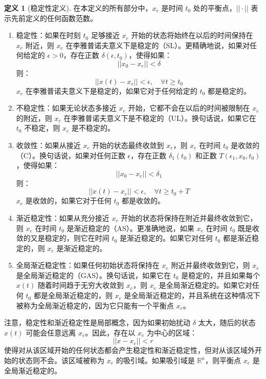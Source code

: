\documentclass[UTF8,12pt,a4paper]{ctexart}
\theoremstyle{definition}
\newtheorem{definition}{定义}[section]
\begin{document}
\begin{definition}[稳定性定义]\label{def:stability}
在本定义的所有部分中，$x_e$ 是时间 $t_0$ 处的平衡点，$||\cdot||$ 表示先前定义的任何函数范数。
\begin{enumerate}
\item 稳定性：如果在时刻 $t_0$ 足够接近 $x_e$ 开始的状态将始终在以后的时间保持在 $x_e$ 附近，则 $x_e$ 在李雅普诺夫意义下是稳定的（SL）。更精确地说，如果对任何给定的 $\epsilon > 0$，存在正数 $\delta(\epsilon, t_0)$，使得如果：
\[
||x_0 - x_e|| < \delta
\]
则：
\[
||x(t) - x_e|| < \epsilon, \quad \forall t \geq t_0
\]
$x_e$ 在李雅普诺夫意义下是稳定的，如果它对于任何给定的 $t_0$ 都是稳定的。

\item 不稳定性：如果无论状态多接近 $x_e$ 开始，它都不会在以后的时间被限制在 $x_e$ 的附近，则 $x_e$ 在李雅普诺夫意义下是不稳定的（UL）。换句话说，如果它在 $t_0$ 不稳定，则 $x_e$ 是不稳定的。

\item 收敛性：如果从接近 $x_e$ 开始的状态最终收敛到 $x_e$，则 $x_e$ 在时间 $t_0$ 是收敛的（C）。换句话说，如果对任何正数 $\epsilon$，存在正数 $\delta_1(t_0)$ 和正数 $T(\epsilon_1, x_0, t_0)$，使得如果：
\[
||x_0 - x_e|| < \delta_1
\]
则：
\[
||x(t) - x_e|| < \epsilon, \quad \forall t \geq t_0 + T
\]
$x_e$ 是收敛的，如果它对于任何 $t_0$ 都是收敛的。

\item 渐近稳定性：如果从充分接近 $x_e$ 开始的状态将保持在附近并最终收敛到它，则 $x_e$ 在时间 $t_0$ 是渐近稳定的（AS）。更准确地说，如果 $x_e$ 在时间 $t_0$ 既是收敛的又是稳定的，则它在时间 $t_0$ 是渐近稳定的。如果它对任何 $t_0$ 都是渐近稳定的，则 $x_e$ 是渐近稳定的。

\item 全局渐近稳定性：如果任何初始状态将保持在 $x_e$ 附近并最终收敛到它，则 $x_e$ 是全局渐近稳定的（GAS）。换句话说，如果它在 $t_0$ 是稳定的，并且如果每个 $x(t)$ 随着时间趋于无穷大收敛到 $x_e$，则 $x_e$ 是全局渐近稳定的。如果它对任何 $t_0$ 都是全局渐近稳定的，则 $x_e$ 是全局渐近稳定的，并且系统在这种情况下被称为全局渐近稳定的，因为它只能有一个平衡点 $x_e$。
\end{enumerate}
\end{definition}

注意，稳定性和渐近稳定性是局部概念，因为如果初始扰动 $\delta$ 太大，随后的状态 $x(t)$ 可能会任意远离 $x_e$。因此，存在以 $x_e$ 为中心的区域：
\[
||x - x_e|| < r
\]
使得对从该区域开始的任何状态都会产生稳定性和渐近稳定性，但对从该区域外开始的状态则不会。该区域被称为 $x_e$ 的吸引域。如果吸引域是 $\mathbb{R}^n$，则平衡点 $x_e$ 是全局渐近稳定的。
\end{document}

